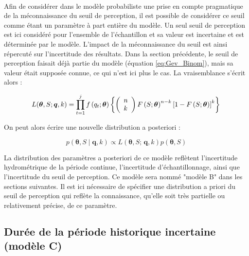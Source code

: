		\paragraph{}
		Afin de considérer dans le modèle probabiliste une prise en compte pragmatique de la méconnaissance du seuil de perception, il est possible de considérer ce seuil comme étant un paramètre à part entière du modèle. Un seul seuil de perception est ici considéré pour l'ensemble de l'échantillon et sa valeur est incertaine et est déterminée par le modèle. L'impact de la méconnaissance du seuil est ainsi répercuté sur l'incertitude des résultats. Dans la section précédente, le seuil de perception faisait déjà partie du modèle (équation \ref{eq:Gev_Binom}), mais sa valeur était supposée connue, ce qui n'est ici plus le cas. La vraisemblance s'écrit alors : 
		
				\begin{equation}
				L(\boldsymbol{\theta}, S ; \boldsymbol{q}, k) =\prod_{t=1}^j f\left(q_t;\boldsymbol{\theta}\right) \left\{\left(\begin{array}{l}
				n \\
				k
				\end{array}\right) F\left(S;\boldsymbol{\theta}\right)^{n-k}\left[1-F\left(S;\boldsymbol{\theta}\right)\right]^k\right\} \\
				\label{eq:Gev_Binom_uS}
				\end{equation}
				
		On peut alors écrire une nouvelle distribution a posteriori : 			
				
				\begin{equation}
					p(\boldsymbol{\theta}, S \mid \boldsymbol{q},k) \propto L(\boldsymbol{\theta},S;\,\boldsymbol{q},k) p(\boldsymbol{\theta},S)
					\label{eq:Bayes_uS}
				\end{equation}
			
		La distribution des paramètres a posteriori de ce modèle reflètent l'incertitude hydrométrique de la période continue, l'incertitude d'échantillonnage, ainsi que l'incertitude du seuil de perception. Ce modèle sera nommé "modèle B" dans les sections suivantes. Il est ici nécessaire de spécifier une distribution a priori du seuil de perception qui reflète la connaissance, qu'elle soit très partielle ou relativement précise, de ce paramètre. 

	\subsection{Durée de la période historique incertaine (modèle C)}
	\label{subsec:modC}
	
